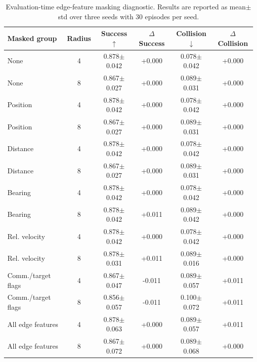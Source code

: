 \begin{table}[t]
\centering
\caption{Evaluation-time edge-feature masking diagnostic. Results are reported as mean$\pm$std over three seeds with 30 episodes per seed.}
\label{tab:edge_feature_masking}
\begin{tabular}{lccccc}
\toprule
Masked group & Radius & Success $\uparrow$ & $\Delta$Success & Collision $\downarrow$ & $\Delta$Collision \\
\midrule
None & 4 & 0.878$\pm$0.042 & +0.000 & 0.078$\pm$0.042 & +0.000 \\
None & 8 & 0.867$\pm$0.027 & +0.000 & 0.089$\pm$0.031 & +0.000 \\
\midrule
Position & 4 & 0.878$\pm$0.042 & +0.000 & 0.078$\pm$0.042 & +0.000 \\
Position & 8 & 0.867$\pm$0.027 & +0.000 & 0.089$\pm$0.031 & +0.000 \\
\midrule
Distance & 4 & 0.878$\pm$0.042 & +0.000 & 0.078$\pm$0.042 & +0.000 \\
Distance & 8 & 0.867$\pm$0.027 & +0.000 & 0.089$\pm$0.031 & +0.000 \\
\midrule
Bearing & 4 & 0.878$\pm$0.042 & +0.000 & 0.078$\pm$0.042 & +0.000 \\
Bearing & 8 & 0.878$\pm$0.042 & +0.011 & 0.089$\pm$0.042 & +0.000 \\
\midrule
Rel. velocity & 4 & 0.878$\pm$0.042 & +0.000 & 0.078$\pm$0.042 & +0.000 \\
Rel. velocity & 8 & 0.878$\pm$0.031 & +0.011 & 0.089$\pm$0.016 & +0.000 \\
\midrule
Comm./target flags & 4 & 0.867$\pm$0.047 & -0.011 & 0.089$\pm$0.057 & +0.011 \\
Comm./target flags & 8 & 0.856$\pm$0.057 & -0.011 & 0.100$\pm$0.072 & +0.011 \\
\midrule
All edge features & 4 & 0.878$\pm$0.063 & +0.000 & 0.089$\pm$0.057 & +0.011 \\
All edge features & 8 & 0.867$\pm$0.072 & +0.000 & 0.089$\pm$0.068 & +0.000 \\
\bottomrule
\end{tabular}
\end{table}
